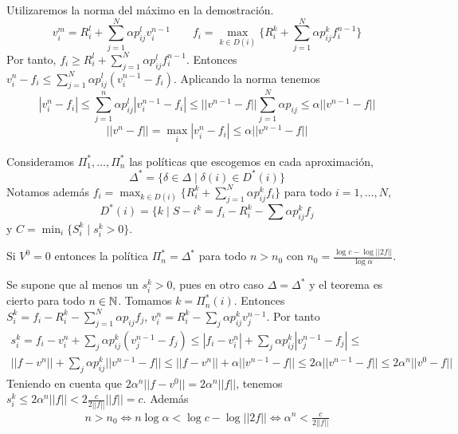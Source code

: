 \documentclass[MIOP.tex]{subfiles}
\begin{document}
\begin{dem}
Utilizaremos la norma del máximo en la demostración. 
$$
v_i^m = R_i^l + \sum_{j=1}^N \alpha p_{ij}^l v_i^{n-1}
\qquad
f_i = \max_{k\in D(i)}  \{R_i^k + \sum_{j=1}^N \alpha p_{ij}^k f_i^{n-1}\}
$$
Por tanto, $f_i \geq R_i^l + \sum_{j=1}^N \alpha p_{ij}^l f_i^{n-1}$. Entonces $v_i^n-f_i \leq \sum_{j=1}^N \alpha p_{ij}^l(v_i^{n-1}-f_i)$. Aplicando la norma tenemos
$$
|v^n_i-f_i| \leq \sum_{j=1}^n \alpha p_{ij}^l |v_i^{n-1}-f_i| \leq ||v^{n-1}-f|| \sum_{j=1}^N \alpha p_{ij} \leq \alpha||v^{n-1}-f||$$
$$
||v^n-f|| = \max_i |v_i^n - f_i| \leq \alpha ||v^{n-1}-f||
$$
\end{dem}
Consideramos $\Pi_1^*, \dotsc, \Pi^*_n$ las políticas que escogemos en cada aproximación, $$\Delta^* = \{\delta \in \Delta \mid \delta(i)\in D^*(i)\}$$
Notamos además $f_i = \max_{k\in D(i)} \{R_i^k + \sum_{j=1}^N\alpha p_{ij}^k f_i\}$ para todo $i=1,\dotsc, N$,
$$ D^*(i)=\{ k\mid S-i ^k = f_i - R_i^k - \sum \alpha p_{ij}^kf_j$$
y $C=\min_i \{S_i^k \mid s_i^k >0\}$.
\begin{teorema}
Si $V^0 =0$ entonces la política $\Pi_n^* = \Delta^*$ para todo $n>n_0$ con $n_0 = \frac{\log c - \log ||2f||}{\log \alpha}$.
\end{teorema}
\begin{dem}
Se supone que al menos un $s_i^k>0$, pues en otro caso $\Delta = \Delta^*$ y el teorema es cierto para todo $n\in\mathbb{N}$. Tomamos $k=\Pi^*_n(i)$. Entonces $S_i^k = f_i - R^k_i - \sum_{j=1}^N \alpha p_{ij}f_j$, $v_i^n = R^k_i - \sum_j \alpha p_{ij}^kv_j^{n-1}$. Por tanto
\begin{gather*}
s_i^k = f_i-v_i^n + \sum_j \alpha p_{ij}^k(v_j^{n-1}-f_j) \leq |f_i - v_i^n|+\sum_j \alpha p_{ij}^k|v_j^{n-1}-f_j| \leq \\
||f-v^n|| + \sum_j \alpha p_{ij}^k
||v^{n-1}-f|| \leq ||f-v^n|| + \alpha ||v^{n-1}-f||  \leq 2 \alpha ||v^{n-1}-f|| \leq 2\alpha^n ||v^0-f||
\end{gather*}
Teniendo en cuenta que $2\alpha^n ||f-v^0|| = 2\alpha^n ||f||$, tenemos $s_i^k \leq 2\alpha^n ||f||<2\frac{c}{2||f||}||f|| = c$. Además
\begin{gather*}
n > n_0 \Leftrightarrow n\log \alpha <\log c - \log ||2f|| \Leftrightarrow \alpha^n < \frac{c}{2||f||}
\end{gather*}

\end{dem}
\end{document}
